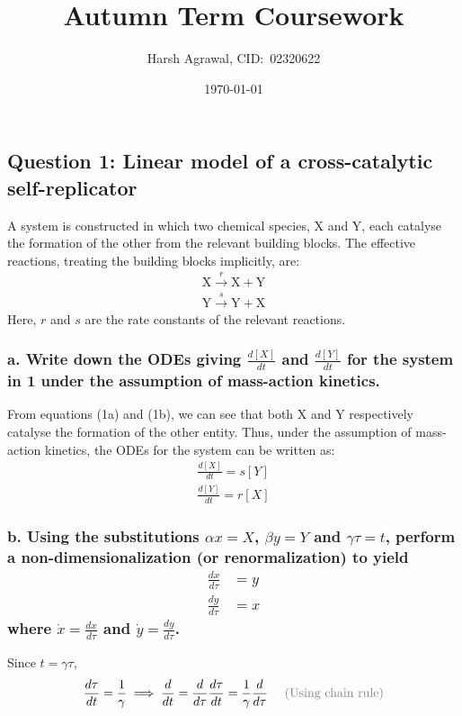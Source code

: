 \documentclass[12pt]{article}
\title{Autumn Term Coursework}
\author{Harsh Agrawal, CID:~02320622}
\date{\today}
\begin{document}
\maketitle

\subsection*{Question 1: Linear model of a cross-catalytic self-replicator}
A system is constructed in which two chemical species, X and Y, each catalyse
the formation of the other from the relevant building blocks. The effective
reactions, treating the building blocks implicitly, are:
\begin{align}
    \text{X} \xrightarrow{r} \text{X} + \text{Y} \nonumber \\
    \text{Y} \xrightarrow{s} \text{Y} + \text{X} \label{eq:1}
\end{align}
Here, $r$ and $s$ are the rate constants of the relevant reactions.

\subsubsection*{a. Write down the ODEs giving $\frac{d[X]}{dt}$ and $\frac{d[Y]}{dt}$ for the system in 1 under the assumption of mass-action kinetics.}

From equations (1a) and (1b), we can see that both X and Y respectively
catalyse the formation of the other entity. Thus, under the assumption of
mass-action kinetics, the ODEs for the system can be written as:
\begin{align*}
    \frac{d[X]}{dt} = s[Y] \\
    \frac{d[Y]}{dt} = r[X]
\end{align*}

\sloppy
\subsubsection*{b. Using the substitutions $\alpha x = X$, $\beta y = Y$ and $\gamma \tau = t$, perform a non-dimensionalization (or renormalization)
    to yield
    \begin{align}
        \frac{dx}{d\tau} & = y \nonumber \\
        \frac{dy}{d\tau} & = x
    \end{align}
    where $\dot{x} = \frac{dx}{d\tau}$ and $\dot{y} = \frac{dy}{d\tau}$.}

Since $t = \gamma \tau$,
\begin{equation*}
    \frac{d\tau}{dt} = \frac{1}{\gamma} \implies \frac{d}{dt} = \frac{d}{d\tau} \frac{d\tau}{dt} = \frac{1}{\gamma} \frac{d}{d\tau} \quad\textcolor{gray}{\text{ (Using chain rule)}}
\end{equation*}
\end{document}
